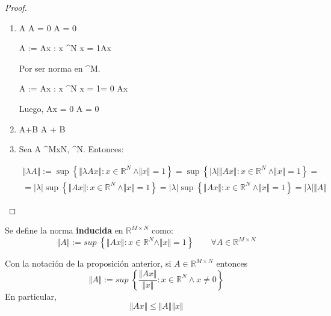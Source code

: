 \begin{proof}

\begin{enumerate}
\item \Vert A \Vert {} \quad \Vert A \Vert = 0 \Leftrightarrow A = 0

\Vert A \Vert := \sup\left\lbrace\Vert Ax \Vert: x \in {}^N \> \wedge \Vert x \Vert = 1\right\rbrace \geq \Vert Ax \Vert {}

Por ser norma en ^M.

\Vert A \Vert := \sup\left\lbrace \Vert Ax \Vert: x \in {}^N \> \wedge \Vert x \Vert = 1\right\rbrace = 0 \geq \Vert Ax \Vert {}

Luego, \Vert Ax \Vert = 0 \Leftrightarrow A = 0

\item \Vert A+B \Vert \leq \Vert A + B \Vert

\item Sea A \in {}^{MxN}, \lambda \in {}^N. Entonces:

\begin{align*}
\Vert \lambda A \Vert := \sup\left\lbrace \Vert \lambda Ax \Vert: x \in \mathbb{R}^N \> \wedge \Vert x \Vert = 1\right\rbrace
= \sup\left\lbrace \left| \lambda \right| \Vert Ax \Vert: x \in \mathbb{R}^N \> \wedge \Vert x \Vert = 1\right\rbrace = \\
= \left| \lambda\right | \sup\left\lbrace \Vert Ax \Vert: x \in \mathbb{R}^N \> \wedge \Vert x \Vert = 1\right\rbrace
= \left| \lambda\right | \sup\left\lbrace \Vert Ax \Vert: x \in \mathbb{R}^N \> \wedge \Vert x \Vert = 1\right\rbrace
= \left| \lambda\right |  \Vert A \Vert
\end{align*}

\end{enumerate}

\end{proof}

\begin{ndef}
Se define la norma \textbf{inducida} en $\mathbb{R}^{M \times N}$ como:
\[ \Vert A \Vert := sup \; \left\lbrace \Vert Ax \Vert : x \in \mathbb{R}^N \wedge \Vert x \Vert = 1 \right\rbrace \qquad \forall A \in \mathbb{R}^{M \times N} \]
\end{ndef}

\begin{nprop}
Con la notación de la proposición anterior, si $A \in \mathbb{R}^{M \times N}$ entonces
\[ \Vert A \Vert := sup \; \left\lbrace \frac{\Vert Ax \Vert}{\Vert x \Vert } : x \in \mathbb{R}^N \wedge x \neq 0 \right\rbrace \]
En particular,
\[ \Vert Ax \Vert \leq \Vert A \Vert \Vert x \Vert \]
\end{nprop}

